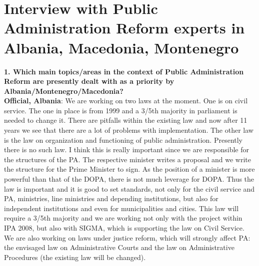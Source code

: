 \chapter{Interview with Public Administration Reform experts in Albania, Macedonia, Montenegro}
\textbf{1. Which main topics/areas in the context of Public Administration Reform are presently dealt with as a priority by Albania/Montenegro/Macedonia? }\\
\textbf{Official, Albania}: We are working on two laws at the moment. One is on civil service. The one in place is from 1999 and a 3/5th majority in parliament is needed to change it. There are pitfalls within the existing law and now after 11 years we see that there are a lot of problems with implementation. The other law is the law on organization and functioning of public administration. Presently there is no such law. I think this is really important since we are responsible for the structures of the PA. The respective minister writes a proposal and we write the structure for the Prime Minister to sign. As the position of a minister is more powerful than that of the DOPA, there is not much leverage for DOPA. Thus the law is important and it is good to set standards, not only for the civil service and PA, ministries, line ministries and depending institutions, but also for independent institutions and even for municipalities and cities. This law will require a 3/5th majority and we are working not only with the project within IPA 2008, but also with SIGMA, which is supporting the law on Civil Service. We are also working on laws under justice reform, which will strongly affect PA: the envisaged law on Administrative Courts and the law on Administrative Procedures (the existing law will be changed).\\
